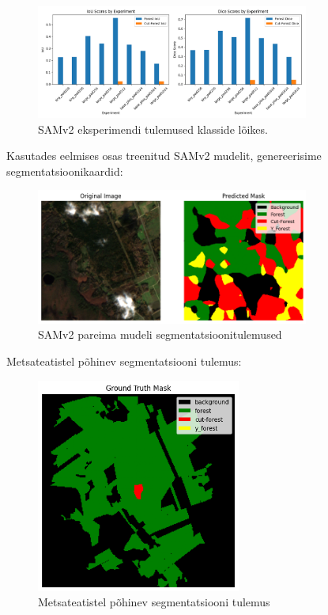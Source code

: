 \begin{figure}[H]
    \centering
    \includegraphics[width=0.8\textwidth]{figures/tulemused/Sam_experimentide_tulemused_klassid.png}
    \caption{SAMv2 eksperimendi tulemused klasside lõikes. }
    \label{fig:sam_result}
\end{figure}

Kasutades eelmises osas treenitud SAMv2 mudelit, genereerisime segmentatsioonikaardid:
\begin{figure}[H]
    \centering
    \includegraphics[width=0.8\textwidth]{figures/tulemused/prediction_3403037_TCI.png}
    \caption{SAMv2 pareima mudeli segmentatsioonitulemused}
    \label{fig:sam_best_result}
\end{figure}

Metsateatistel põhinev segmentatsiooni tulemus:
\begin{figure}[H]
    \centering
    \includegraphics[width=0.6\textwidth]{figures/tulemused/ground_truth_mask_3403037.png}
    \caption{Metsateatistel põhinev segmentatsiooni tulemus}
    \label{fig:actual_mask}
\end{figure}



